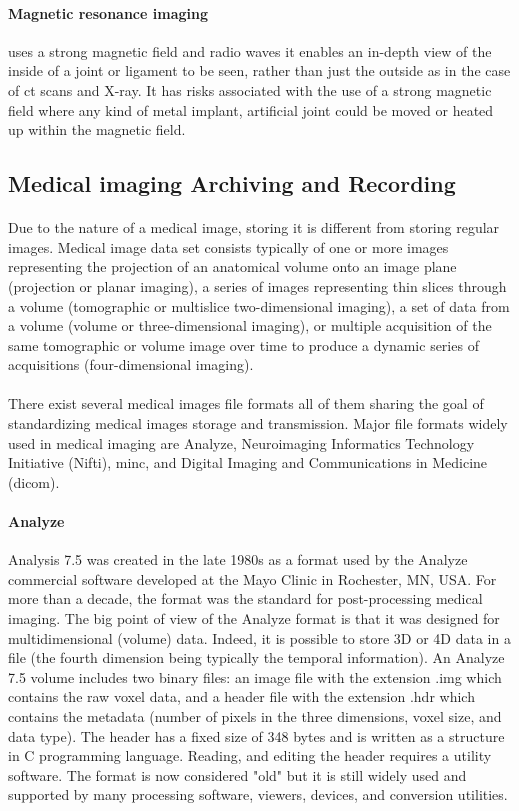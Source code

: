 \paragraph{Magnetic resonance imaging}
uses a strong magnetic field and radio waves it enables an in-depth view of the inside of a joint or ligament to be seen, rather than just the outside as in the case of \acs{ct} scans and X-ray. It has risks associated with the use of a strong magnetic field where any kind of metal implant, artificial joint could be moved or heated up within the magnetic field.
\subsection{Medical imaging Archiving and Recording} 
\paragraph{}
Due to the nature of a medical image, storing it is different from storing regular images. Medical image data set consists typically of one or more images representing the projection of an anatomical volume onto an image plane (projection or planar imaging), a series of images representing thin slices through a volume (tomographic or multislice two-dimensional imaging), a set of data from a volume (volume or three-dimensional imaging), or multiple acquisition of the same tomographic or volume image over time to produce a dynamic series of acquisitions (four-dimensional imaging).\cite{ME:1}
\paragraph{}
There exist several medical images file formats all of them sharing the goal of standardizing medical images storage and transmission. Major file formats widely used in medical imaging are Analyze, Neuroimaging Informatics Technology Initiative (Nifti), \acs{minc}, and Digital Imaging and Communications in Medicine (\acs{dicom}).
\paragraph{Analyze}
Analysis 7.5 was created in the late 1980s as a format used by the Analyze commercial software developed at the Mayo Clinic in Rochester, MN, USA. For more than a decade, the format was the standard for post-processing medical imaging. The big point of view of the Analyze format is that it was designed for multidimensional (volume) data. Indeed, it is possible to store 3D or 4D data in a file (the fourth dimension being typically the temporal information). An Analyze 7.5 volume includes two binary files: an image file with the extension .img which contains the raw voxel data, and a header file with the extension .hdr which contains the metadata (number of pixels in the three dimensions, voxel size, and data type). The header has a fixed size of 348 bytes  and is written as a structure in C programming language. Reading, and editing the header requires a utility software. The format is now considered "old" but it is still widely used and supported by many processing software, viewers, devices, and conversion utilities.\cite{ME:1}
